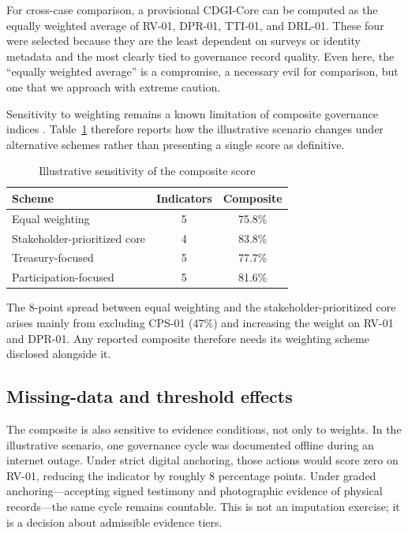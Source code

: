 \documentclass[sigconf,anonymous]{acmart}
\begin{document}
For cross-case comparison, a provisional CDGI-Core can be computed as the equally weighted average of RV-01, DPR-01, TTI-01, and DRL-01. These four were selected because they are the least dependent on surveys or identity metadata and the most clearly tied to governance record quality. Even here, the “equally weighted average” is a compromise, a necessary evil for comparison, but one that we approach with extreme caution.

Sensitivity to weighting remains a known limitation of composite governance indices \cite{langbein2010,oman2010}. Table~\ref{tab:sensitivity} therefore reports how the illustrative scenario changes under alternative schemes rather than presenting a single score as definitive.

\begin{table}[t]
\caption{Illustrative sensitivity of the composite score}
\label{tab:sensitivity}
\small
\begin{tabularx}{\columnwidth}{l c c}
\toprule
Scheme & Indicators & Composite \\
\midrule
Equal weighting & 5 & 75.8\% \\
Stakeholder-prioritized core & 4 & 83.8\% \\
Treasury-focused & 5 & 77.7\% \\
Participation-focused & 5 & 81.6\% \\
\bottomrule
\end{tabularx}
\end{table}

The 8-point spread between equal weighting and the stakeholder-prioritized core arises mainly from excluding CPS-01 (47\%) and increasing the weight on RV-01 and DPR-01. Any reported composite therefore needs its weighting scheme disclosed alongside it.

\subsection{Missing-data and threshold effects}

The composite is also sensitive to evidence conditions, not only to weights. In the illustrative scenario, one governance cycle was documented offline during an internet outage. Under strict digital anchoring, those actions would score zero on RV-01, reducing the indicator by roughly 8 percentage points. Under graded anchoring---accepting signed testimony and photographic evidence of physical records---the same cycle remains countable. This is not an imputation exercise; it is a decision about admissible evidence tiers.
\end{document}

